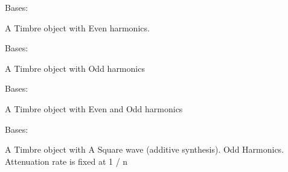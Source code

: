 \documentclass[letterpaper,10pt,english]{sphinxmanual}
\begin{document}
\begin{fulllineitems}
\label{index:Timbre.generators.Even}
Bases: {\hyperref[index:Timbre.timbre.Timbre]{\emph{}}}

A Timbre object with Even harmonics.

\end{fulllineitems}


\begin{fulllineitems}
\label{index:Timbre.generators.Odd}
Bases: {\hyperref[index:Timbre.timbre.Timbre]{\emph{}}}

A Timbre object with Odd harmonics

\end{fulllineitems}


\begin{fulllineitems}
\label{index:Timbre.generators.Evenodd}
Bases: {\hyperref[index:Timbre.timbre.Timbre]{\emph{}}}

A Timbre object with Even and Odd harmonics

\end{fulllineitems}


\begin{fulllineitems}
\label{index:Timbre.generators.Square}
Bases: {\hyperref[index:Timbre.timbre.Timbre]{\emph{}}}

A Timbre object with A Square wave (additive synthesis). Odd Harmonics. Attenuation rate is fixed at 1 / n

\end{fulllineitems}

\end{document}
